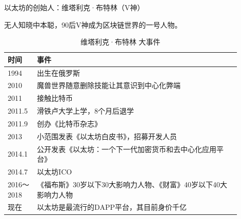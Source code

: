 \documentclass[11pt]{beamer}
\begin{document}
\begin{frame}{以太坊的创始人：维塔利克·布特林（V神）}
	
	{\footnotesize 无人知晓中本聪，90后V神成为区块链世界的一号人物。}
	\begin{minipage}[t]{0.7\linewidth}
\begin{table}[]
	\footnotesize
	\begin{tabular}{@{}p{0.1\linewidth}p{0.8\linewidth}@{}}
		\toprule
		时间     & 事件                              \\ \midrule
		1994   & 出生在俄罗斯                          \\
		2010 & 魔兽世界随意删除技能让其意识到中心化弊端 \\
		2011   & 接触比特币                           \\
		2011.5 & 滑铁卢大学上学，8个月后退学                  \\
		2011.9 & 创办《比特币杂志》                       \\
		2013   & 小范围发表《以太坊白皮书》，招募开发人员            \\
		2014.1 & 公开发表《以太坊：一个下一代加密货币和去中心化应用平台》    \\
		2014.7 & 以太坊ICO                          \\
		2016～2018 & 《福布斯》30岁以下30大影响力人物、《财富》40岁以下40大影响力人物  \\
		现在  & 以太坊是最流行的DAPP平台，其目前身价千亿                          \\ \bottomrule
	\end{tabular}
	\caption{维塔利克·布特林 大事件}
\end{table}
	\end{minipage}%
	\begin{minipage}[t]{0.3\linewidth}
		\begin{figure}
			\centering
\end{figure}
\end{minipage}
\end{frame}
\end{document}
